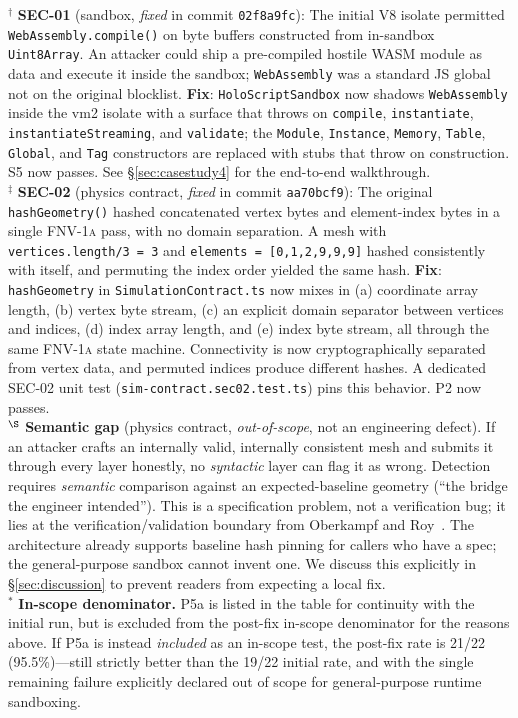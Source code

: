 \documentclass[letterpaper,twocolumn,10pt]{article}
\newcommand{\fnvhash}{\textsc{FNV-1a}}
\begin{document}
\footnotesize
$^{\dagger}$ \textbf{SEC-01} (sandbox, \emph{fixed} in commit
\texttt{02f8a9fc}): The initial V8 isolate permitted
\texttt{WebAssembly.compile()} on byte buffers constructed from
in-sandbox \texttt{Uint8Array}. An attacker could ship a pre-compiled
hostile WASM module as data and execute it inside the sandbox;
\texttt{WebAssembly} was a standard JS global not on the original
blocklist. \textbf{Fix}: \texttt{HoloScriptSandbox} now shadows
\texttt{WebAssembly} inside the vm2 isolate with a surface that throws
on \texttt{compile}, \texttt{instantiate}, \texttt{instantiateStreaming},
and \texttt{validate}; the \texttt{Module}, \texttt{Instance},
\texttt{Memory}, \texttt{Table}, \texttt{Global}, and \texttt{Tag}
constructors are replaced with stubs that throw on construction.
S5 now passes. See \S\ref{sec:casestudy4} for the end-to-end walkthrough.\\
$^{\ddagger}$ \textbf{SEC-02} (physics contract, \emph{fixed} in commit
\texttt{aa70bcf9}): The original \texttt{hashGeometry()} hashed
concatenated vertex bytes and element-index bytes in a single
\fnvhash{} pass, with no domain separation. A mesh with
\texttt{vertices.length/3 = 3} and \texttt{elements = [0,1,2,9,9,9]}
hashed consistently with itself, and permuting the index order yielded
the same hash. \textbf{Fix}: \texttt{hashGeometry} in
\texttt{SimulationContract.ts} now mixes in (a) coordinate array
length, (b) vertex byte stream, (c) an explicit domain separator
between vertices and indices, (d) index array length, and (e) index
byte stream, all through the same \fnvhash{} state machine.
Connectivity is now cryptographically separated from vertex data, and
permuted indices produce different hashes. A dedicated SEC-02 unit
test (\texttt{sim-contract.sec02.test.ts}) pins this behavior. P2 now
passes.\\
$^{\S}$ \textbf{Semantic gap} (physics contract, \emph{out-of-scope},
not an engineering defect). If an attacker crafts an internally
valid, internally consistent mesh and submits it through every layer
honestly, no \emph{syntactic} layer can flag it as wrong. Detection
requires \emph{semantic} comparison against an expected-baseline
geometry (``the bridge the engineer intended''). This is a
specification problem, not a verification bug; it lies at the
verification/validation boundary from Oberkampf and
Roy~\cite{oberkampf2010verification}. The architecture already
supports baseline hash pinning for callers who have a spec; the
general-purpose sandbox cannot invent one. We discuss this explicitly
in \S\ref{sec:discussion} to prevent readers from expecting a local
fix.\\
$^{\ast}$ \textbf{In-scope denominator.} P5a is listed in the table
for continuity with the initial run, but is excluded from the post-fix
in-scope denominator for the reasons above. If P5a is instead
\emph{included} as an in-scope test, the post-fix rate is 21/22
(95.5\%)---still strictly better than the 19/22 initial rate, and
with the single remaining failure explicitly declared out of scope
for general-purpose runtime sandboxing.
\normalsize
\end{document}
